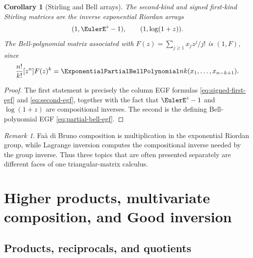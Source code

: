\documentclass[11pt,a4paper,oneside,openany]{book}
\newtheorem{corollary}[theorem]{Corollary}
\theoremstyle{definition}
\theoremstyle{remark}
\newtheorem{remark}[theorem]{Remark}
\begin{document}
\begin{corollary}[Stirling and Bell arrays]
The second-kind and signed first-kind Stirling matrices are the inverse
exponential Riordan arrays
\begin{equation}\label{eq:ext-stirling-riordan}
 (1,\EulerE^z-1),\qquad (1,\log(1+z)).
\end{equation}
The Bell-polynomial matrix associated with
\(F(z)=\sum_{j\ge1}x_jz^j/j!\) is \((1,F)\), since
\begin{equation}\label{eq:ext-bell-riordan}
 \frac{n!}{k!}[z^n]F(z)^k
 =\ExponentialPartialBellPolynomial nk(x_1,\ldots,x_{n-k+1}).
\end{equation}
\end{corollary}
\begin{proof}
The first statement is precisely the column EGF formulas
\eqref{eq:signed-first-egf} and \eqref{eq:second-egf}, together with the fact
that \(\EulerE^z-1\) and \(\log(1+z)\) are compositional inverses.  The second is the
defining Bell-polynomial EGF \eqref{eq:partial-bell-egf}.
\end{proof}

\begin{remark}
Fa\`a di Bruno composition is multiplication in the exponential Riordan group,
while Lagrange inversion computes the compositional inverse needed by the group
inverse.  Thus three topics that are often presented separately are different
faces of one triangular-matrix calculus.
\end{remark}

\chapter{Higher products, multivariate composition, and Good inversion}
\label{ch:ext-multivariate}

\section{Products, reciprocals, and quotients}
\end{document}
